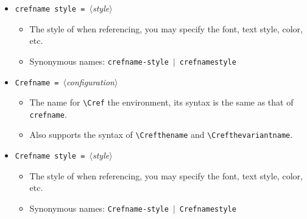\documentclass[classical]{einfart}
\newcommand{\meta}[1]{$\langle${\normalfont\itshape#1}$\rangle$}
\newcommand{\commandoption}[1]{\textcolor{code-keys}{\texttt{#1}}}
\begin{document}
\begin{itemize}[label=,leftmargin=1.25em,itemindent=-1.25em]
\begin{itemize}
\begin{code}
[(*\meta{singular definite article}*)]{(*\meta{singular name}*)}[(*\meta{plural definite article}*)]{(*\meta{plural name}*)}
\end{code}
            This would be useful for languages like French, Italian, Spanish, etc.
            \item Also supports the syntax of \lstinline|\crefthevariantname|, thus you can assign different set of names for different variants/declensions (the first line in the configuration is the default name set, which is used in case no variants is specified when referencing):
\begin{code}
(*\commandoption{crefname}*) = {
    (*\meta{language name}*) = { [...]{...}[...]{...}
        , (*\meta{variant 1}*) = [...]{...}[...]{...}
        , (*\meta{variant 2}*) = [...]{...}[...]{...}
        ...
    }
  }
\end{code}
            This would be useful for languages like German, Russian, etc.
        \end{itemize}
    \item \commandoption{crefname style}\lstinline| = |\meta{style}
        \begin{itemize}
            \item The style of  when referencing, you may specify the font, text style, color, etc.
            \item Synonymous names: \commandoption{crefname-style} \,$|$\, \commandoption{crefnamestyle}
        \end{itemize}
    \item \commandoption{Crefname}\lstinline| = |\meta{configuration}
        \begin{itemize}
            \item The name for \lstinline|\Cref| the environment, its syntax is the same as that of \commandoption{crefname}.
            \item Also supports the syntax of \lstinline|\Crefthename| and \lstinline|\Crefthevariantname|.
        \end{itemize}
    \item \commandoption{Crefname style}\lstinline| = |\meta{style}
        \begin{itemize}
            \item The style of  when referencing, you may specify the font, text style, color, etc.
            \item Synonymous names: \commandoption{Crefname-style} \,$|$\, \commandoption{Crefnamestyle}

\end{itemize}
\end{itemize}
\end{document}
